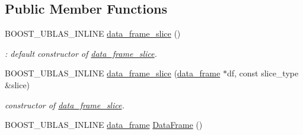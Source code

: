 \subsection*{Public Member Functions}
\begin{DoxyCompactItemize}
\item 
B\+O\+O\+S\+T\+\_\+\+U\+B\+L\+A\+S\+\_\+\+I\+N\+L\+I\+NE \hyperlink{classboost_1_1numeric_1_1ublas_1_1data__frame__slice_a08f7552cc358a576165c6394999dc878}{data\+\_\+frame\+\_\+slice} ()\hypertarget{classboost_1_1numeric_1_1ublas_1_1data__frame__slice_a08f7552cc358a576165c6394999dc878}{}\label{classboost_1_1numeric_1_1ublas_1_1data__frame__slice_a08f7552cc358a576165c6394999dc878}

\begin{DoxyCompactList}\small\item\em \+: default constructor of \hyperlink{classboost_1_1numeric_1_1ublas_1_1data__frame__slice}{data\+\_\+frame\+\_\+slice}. \end{DoxyCompactList}\item 
B\+O\+O\+S\+T\+\_\+\+U\+B\+L\+A\+S\+\_\+\+I\+N\+L\+I\+NE \hyperlink{classboost_1_1numeric_1_1ublas_1_1data__frame__slice_a4f440936f399c24489b37b2104f7a768}{data\+\_\+frame\+\_\+slice} (\hyperlink{classboost_1_1numeric_1_1ublas_1_1data__frame}{data\+\_\+frame} $\ast$df, const slice\+\_\+type \&slice)
\begin{DoxyCompactList}\small\item\em constructor of \hyperlink{classboost_1_1numeric_1_1ublas_1_1data__frame__slice}{data\+\_\+frame\+\_\+slice}. \end{DoxyCompactList}\item 
B\+O\+O\+S\+T\+\_\+\+U\+B\+L\+A\+S\+\_\+\+I\+N\+L\+I\+NE \hyperlink{classboost_1_1numeric_1_1ublas_1_1data__frame}{data\+\_\+frame} \hyperlink{classboost_1_1numeric_1_1ublas_1_1data__frame__slice_a8daaa1c0828185701ca1bbddfe29af03}{Data\+Frame} ()\hypertarget{classboost_1_1numeric_1_1ublas_1_1data__frame__slice_a8daaa1c0828185701ca1bbddfe29af03}{}\label{classboost_1_1numeric_1_1ublas_1_1data__frame__slice_a8daaa1c0828185701ca1bbddfe29af03}


\end{DoxyCompactItemize}
